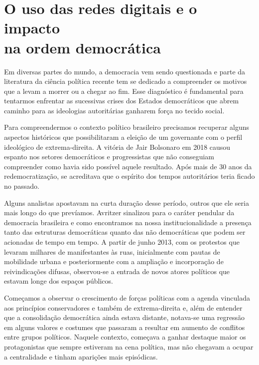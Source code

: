 \chapter[O uso das redes digitais e o impacto na ordem\\democrática]{O uso das redes digitais e o impacto\\na ordem democrática}

Em diversas partes do mundo, a democracia vem sendo questionada e parte
da literatura da ciência política recente tem se dedicado a compreender
os motivos que a levam a morrer ou a chegar ao fim. Esse
diagnóstico é fundamental para tentarmos enfrentar as sucessivas crises
dos Estados democráticos que abrem caminho para as ideologias
autoritárias ganharem força no tecido social.

Para compreendermos o contexto político brasileiro precisamos recuperar
alguns aspectos históricos que possibilitaram a eleição de um governante
com o perfil ideológico de extrema-direita. A vitória de Jair Bolsonaro
em 2018 causou espanto nos setores democráticos e progressistas que não
conseguiam compreender como havia sido possível aquele resultado. Após
mais de 30 anos da redemocratização, se acreditava que o espírito dos
tempos autoritários teria ficado no passado.

Alguns analistas apostavam na curta duração desse período, outros que
ele seria mais longo do que prevíamos. Avritzer sinalizou para o 
caráter pendular da democracia brasileira e como encontramos na nossa
institucionalidade a presença tanto das estruturas democráticas quanto
das não democráticas que podem ser acionadas de tempo em tempo. A partir
de junho 2013, com os protestos que levaram milhares de manifestantes às
ruas, inicialmente com pautas de mobilidade urbana e posteriormente com
a ampliação e incorporação de reivindicações difusas, observou-se a
entrada de novos atores políticos que estavam longe dos espaços
públicos.

Começamos a observar o crescimento de forças políticas com a agenda
vinculada aos princípios conservadores e também de extrema-direita e,
além de entender que a consolidação democrática ainda estava distante,
notava-se uma regressão em alguns valores e costumes que passaram a
resultar em aumento de conflitos entre grupos políticos. Naquele
contexto, começava a ganhar destaque maior os protagonistas que sempre
estiveram na cena política, mas não chegavam a ocupar a centralidade e
tinham aparições mais episódicas.

